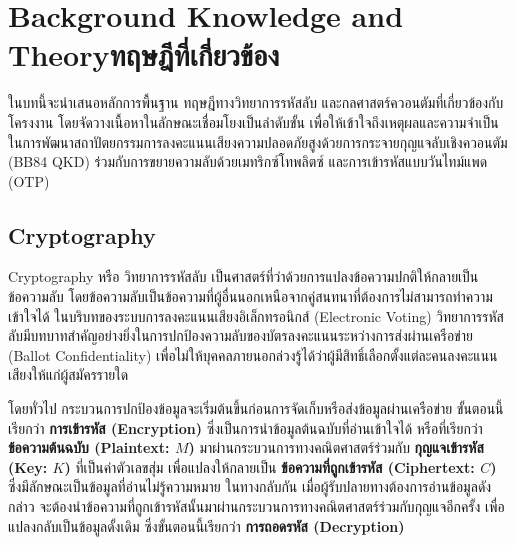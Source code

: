 \chapter{\ifenglish Background Knowledge and Theory\else ทฤษฎีที่เกี่ยวข้อง\fi}

ในบทนี้จะนำเสนอหลักการพื้นฐาน ทฤษฎีทางวิทยาการรหัสลับ และกลศาสตร์ควอนตัมที่เกี่ยวข้องกับโครงงาน โดยจัดวางเนื้อหาในลักษณะเชื่อมโยงเป็นลำดับขั้น เพื่อให้เข้าใจถึงเหตุผลและความจำเป็นในการพัฒนาสถาปัตยกรรมการลงคะแนนเสียงความปลอดภัยสูงด้วยการกระจายกุญแจลับเชิงควอนตัม (BB84 QKD) ร่วมกับการขยายความลับด้วยเมทริกซ์โทพลิตซ์ และการเข้ารหัสแบบวันไทม์แพด (OTP)


\section{Cryptography}
Cryptography หรือ วิทยาการรหัสลับ เป็นศาสตร์ที่ว่าด้วยการแปลงข้อความปกติให้กลายเป็นข้อความลับ โดยข้อความลับเป็นข้อความที่ผู้อื่นนอกเหนือจากคู่สนทนาที่ต้องการไม่สามารถทำความเข้าใจได้ ในบริบทของระบบการลงคะแนนเสียงอิเล็กทรอนิกส์ (Electronic Voting) วิทยาการรหัสลับมีบทบาทสำคัญอย่างยิ่งในการปกป้องความลับของบัตรลงคะแนนระหว่างการส่งผ่านเครือข่าย (Ballot Confidentiality) เพื่อไม่ให้บุคคลภายนอกล่วงรู้ได้ว่าผู้มีสิทธิ์เลือกตั้งแต่ละคนลงคะแนนเสียงให้แก่ผู้สมัครรายใด

โดยทั่วไป กระบวนการปกป้องข้อมูลจะเริ่มต้นขึ้นก่อนการจัดเก็บหรือส่งข้อมูลผ่านเครือข่าย ขั้นตอนนี้เรียกว่า \textbf{การเข้ารหัส (Encryption)} ซึ่งเป็นการนำข้อมูลต้นฉบับที่อ่านเข้าใจได้ หรือที่เรียกว่า \textbf{ข้อความต้นฉบับ (Plaintext: $M$)} มาผ่านกระบวนการทางคณิตศาสตร์ร่วมกับ \textbf{กุญแจเข้ารหัส (Key: $K$)} ที่เป็นค่าตัวเลขสุ่ม เพื่อแปลงให้กลายเป็น \textbf{ข้อความที่ถูกเข้ารหัส (Ciphertext: $C$)} ซึ่งมีลักษณะเป็นข้อมูลที่อ่านไม่รู้ความหมาย ในทางกลับกัน เมื่อผู้รับปลายทางต้องการอ่านข้อมูลดังกล่าว จะต้องนำข้อความที่ถูกเข้ารหัสนั้นมาผ่านกระบวนการทางคณิตศาสตร์ร่วมกับกุญแจอีกครั้ง เพื่อแปลงกลับเป็นข้อมูลดั้งเดิม ซึ่งขั้นตอนนี้เรียกว่า \textbf{การถอดรหัส (Decryption)}

